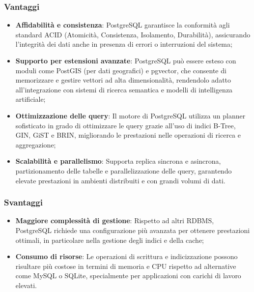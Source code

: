 \subsubsection{Vantaggi}
\begin{itemize}
    \item \textbf{Affidabilità e consistenza}: PostgreSQL garantisce la conformità agli standard ACID (Atomicità, Consistenza, Isolamento, Durabilità), assicurando l’integrità dei dati anche in presenza di errori o interruzioni del sistema;
    \item \textbf{Supporto per estensioni avanzate}: PostgreSQL può essere esteso con moduli come PostGIS (per dati geografici) e pgvector, che consente di memorizzare e gestire vettori ad alta dimensionalità, rendendolo adatto all’integrazione con sistemi di ricerca semantica e modelli di intelligenza artificiale;
    \item \textbf{Ottimizzazione delle query}: Il motore di PostgreSQL utilizza un planner sofisticato in grado di ottimizzare le query grazie all’uso di indici B-Tree, GIN, GiST e BRIN, migliorando le prestazioni nelle operazioni di ricerca e aggregazione;
    \item \textbf{Scalabilità e parallelismo}: Supporta replica sincrona e asincrona, partizionamento delle tabelle e parallelizzazione delle query, garantendo elevate prestazioni in ambienti distribuiti e con grandi volumi di dati.
\end{itemize}
\subsubsection{Svantaggi}
\begin{itemize}
    \item \textbf{Maggiore complessità di gestione}: Rispetto ad altri RDBMS, PostgreSQL richiede una configurazione più avanzata per ottenere prestazioni ottimali, in particolare nella gestione degli indici e della cache;
    \item \textbf{Consumo di risorse}: Le operazioni di scrittura e indicizzazione possono risultare più costose in termini di memoria e CPU rispetto ad alternative come MySQL o SQLite, specialmente per applicazioni con carichi di lavoro elevati.
\end{itemize}

